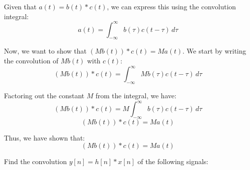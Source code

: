 \documentclass[a4paper, 10pt]{article}
\begin{document}
\begin{solution}
Given that \( a(t) = b(t) * c(t) \), we can express this using the convolution integral:
\[ a(t) = \int_{-\infty}^{\infty} b(\tau) c(t - \tau) \, d\tau \]

Now, we want to show that \( (Mb(t)) * c(t) = Ma(t) \). We start by writing the convolution of \( Mb(t) \) with \( c(t) \):
\[ (Mb(t)) * c(t) = \int_{-\infty}^{\infty} Mb(\tau) c(t - \tau) \, d\tau \]

Factoring out the constant \( M \) from the integral, we have:
\[ (Mb(t)) * c(t) = M \int_{-\infty}^{\infty} b(\tau) c(t - \tau) \, d\tau \]
\[ (Mb(t)) * c(t) = M a(t) \]

Thus, we have shown that:
\[ \boxed{(Mb(t)) * c(t) = Ma(t)} \]
\end{solution}

\newpage

\begin{problem}
Find the convolution \( y[n] = h[n] * x[n] \) of the following signals:
\end{problem}
\end{document}
